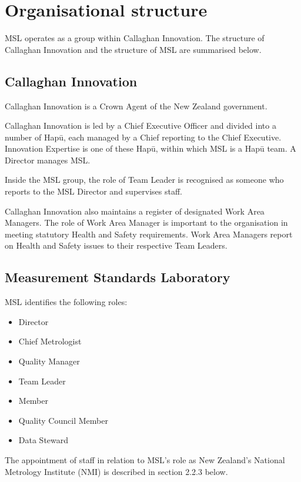 \section{Organisational structure}
\label{s:organisation}
MSL operates as a group within Callaghan Innovation. The structure of Callaghan Innovation and the structure of MSL are summarised below.

\subsection{Callaghan Innovation}
Callaghan Innovation is a Crown Agent of the New Zealand government. 

Callaghan Innovation is led by a Chief Executive Officer and divided into a number of Hap\=u, each managed by a Chief reporting to the Chief Executive. Innovation Expertise is one of these Hap\=u, within which MSL is a Hap\=u team. A Director manages MSL.

Inside the MSL group, the role of Team Leader is recognised as someone who reports to the MSL Director and supervises staff.

Callaghan Innovation also maintains a register of designated Work Area Managers. The role of Work Area Manager is important to the organisation in meeting statutory Health and Safety requirements. 
Work Area Managers report on Health and Safety issues to their respective Team Leaders.

\subsection{Measurement Standards Laboratory}
MSL identifies the following roles:
\begin{itemize}
\item	Director
\item	Chief Metrologist
\item	Quality Manager
\item	Team Leader
\item	Member
\item	Quality Council Member
\item	Data Steward
\end{itemize}
The appointment of staff in relation to MSL's role as New Zealand's National Metrology Institute (NMI) is described in section 2.2.3 below.
